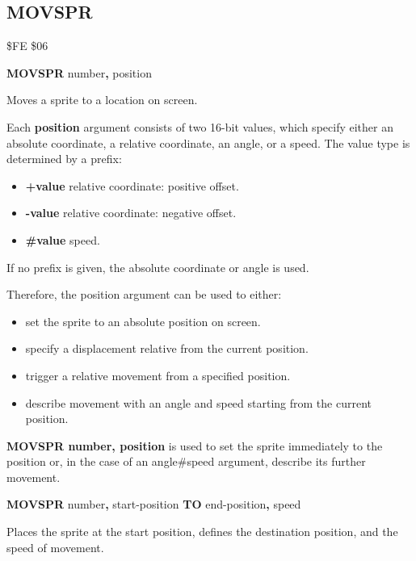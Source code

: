 \subsection{MOVSPR}
\begin{description}[leftmargin=2cm,style=nextline]
\item [Token:] \$FE \$06
\item [Format:] {\bf MOVSPR} number{\bf,} position
\item [Usage:]  Moves a sprite to a location on screen.

                Each {\bf position} argument consists of two 16-bit values,
                which specify either an absolute coordinate, a relative coordinate,
                an angle, or a speed. The value type is determined by a prefix:

                \begin{itemize}
                    \item {\bf +value} relative coordinate: positive offset.
                    \item {\bf -value} relative coordinate: negative offset.
                    \item {\bf \#value} speed.
                \end{itemize}

                If no prefix is given, the absolute coordinate or angle is used.

                Therefore, the position argument can be used to either:
                \begin{itemize}
                    \item set the sprite to an absolute position on screen.
                    \item specify a displacement relative from the current position.
                    \item trigger a relative movement from a specified position.
                    \item describe movement with an angle and speed starting from the current position.
                \end{itemize}

                {\bf MOVSPR number, position} is used to
                set the sprite immediately to the position or, in the case of
                an angle\#speed argument, describe its further movement.

\item [Format:] {\bf MOVSPR} number{\bf,} start-position
		{\bf TO} end-position{\bf,} speed
\item [Usage:]  Places the sprite at the start position, defines the
                destination position, and the speed of movement.


\end{description}
